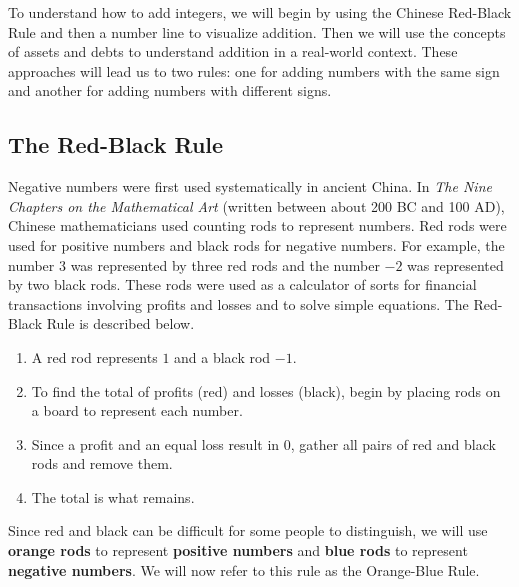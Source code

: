 \documentclass{ximera}[font=12pt]
\begin{document}
To understand how to add integers, we will begin by using the Chinese Red-Black Rule and then a number line to visualize addition.  Then we will use the concepts of assets and debts to understand addition in a real-world context.  These approaches will lead us to two rules: one for adding numbers with the same sign and another for adding numbers with different signs.

\subsection*{The Red-Black Rule}

Negative numbers were first used systematically in ancient China. In \emph{The Nine Chapters on the Mathematical Art} (written between about 200 BC and 100 AD), Chinese mathematicians used counting rods to represent numbers.  Red rods were used for positive numbers and black rods for negative numbers.  For example, the number 3 was
represented by three red rods and the number $-2$ was represented by two black rods.  These rods were used as a calculator of sorts for financial transactions involving profits and losses and to solve simple equations.  The Red-Black Rule is described below.

\begin{enumerate}[itemsep=2ex]
\item A red rod represents $1$ and a black rod $-1.$

\item To find the total of profits (red) and losses (black), begin by placing rods on a board to represent each number.

\item Since a profit and an equal loss result in 0, gather all pairs of red and black rods and remove them.

\item The total is what remains.
\end{enumerate}


Since red and black can be difficult for some people to distinguish, we will use \textcolor{orange!85!black}{\textbf{orange rods}} to represent \textcolor{orange!85!black}{\textbf{positive numbers}} and \textcolor{blue!70!black}{\textbf{blue rods}} to represent \textcolor{blue!70!black}{\textbf{negative numbers}}.
We will now refer to this rule as the Orange-Blue Rule.
\end{document}
